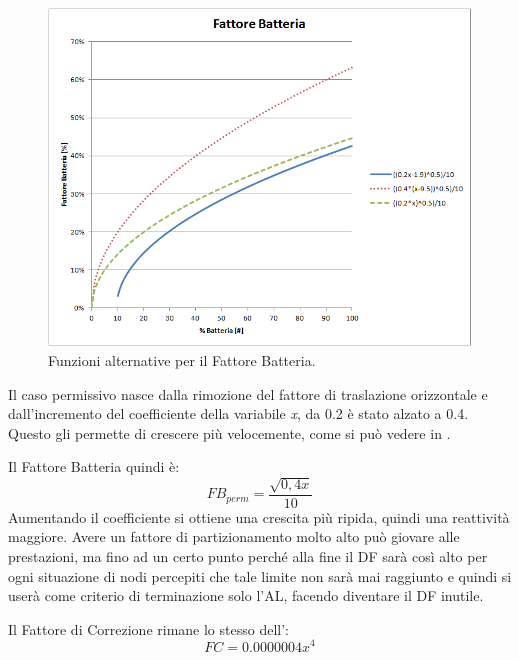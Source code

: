 \begin{figure}[tb]
	\centering
	\includegraphics[width=0.9\linewidth]{Images/grafici_usati/DF_battery_factor_perm_conserv}
	\caption[Fattore Batteria bis]{Funzioni alternative per il Fattore Batteria.}
	\label{fig:DF_battery_factor_perm_conserv}
\end{figure}
\bigskip


Il caso permissivo nasce dalla rimozione del fattore di traslazione orizzontale e dall'incremento del coefficiente della variabile \textit{x}, da 0.2 è stato alzato a 0.4. Questo gli permette di crescere più velocemente, come si può vedere in .

Il Fattore Batteria quindi è:
\begin{equation}
	FB_{perm}=\dfrac{\sqrt{0,4x}}{10}\nonumber
\end{equation}
Aumentando il coefficiente si ottiene una crescita più ripida, quindi una reattività maggiore. Avere un fattore di partizionamento molto alto può giovare alle prestazioni, ma fino ad un certo punto perché alla fine il DF sarà così alto per ogni situazione di nodi percepiti che tale limite non sarà mai raggiunto e quindi si userà come criterio di terminazione solo l'AL, facendo diventare il DF inutile.

Il Fattore di Correzione rimane lo stesso dell':
\begin{equation}
	FC = 0.0000004x^4 \nonumber
\end{equation}

